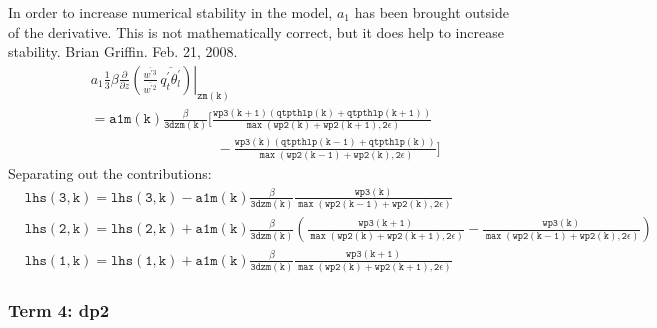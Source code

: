 \documentclass[11pt,fleqn]{article}
\newcommand{\ptlder}[2]{\frac{\partial #1}{\partial #2}}
\begin{document}
%
In order to increase numerical stability in the model, $a_{1}$ has been brought
outside of the derivative.  This is not mathematically correct, but it does 
help to increase stability.  Brian Griffin.  Feb. 21, 2008.
% 
\begin{equation}
\begin{split}
& \left.
  a_1
  \frac{1}{3} \beta
   \ptlder{}{z}
     \left( 
       \frac{\overline{w^{'3}}}{\overline{w^{'2}}} \,
       \overline{q_t^{'}\theta_l^{'}}
     \right)
   \right|_{\mathtt{zm(k)}} \\
&= \mathtt{
    a1m(k)
    \frac{\beta}{3 dzm(k)}
    \bigg[ \frac{wp3(k+1) \left(qtpthlp(k)+qtpthlp(k+1) \right)}
                {\max\left(wp2(k)+wp2(k+1),2\epsilon\right)} } \\
&  \mathtt{ \quad \quad \quad \quad \quad \quad \quad \quad \quad
          -\frac{wp3(k) \left(qtpthlp(k-1)+qtpthlp(k) \right)}
                {\max\left(wp2(k-1)+wp2(k),2\epsilon\right)}
    \bigg]
    }
\end{split}
\end{equation}
%
Separating out the contributions:
%
\begin{equation}
\begin{split}
& \mathtt{ 
   lhs(3,k) = lhs(3,k) - a1m(k)\frac{\beta}{3 dzm(k)}
                 \frac{wp3(k)}
                      {\max\left(wp2(k-1)+wp2(k),2\epsilon\right)}
  } \\
& \mathtt{
   lhs(2,k) = lhs(2,k) + a1m(k)\frac{\beta}{3 dzm(k)}
                 \left(
                   \frac{wp3(k+1)}
                        {\max\left(wp2(k)+wp2(k+1),2\epsilon\right)}
                  -\frac{wp3(k)}
                        {\max\left(wp2(k-1)+wp2(k),2\epsilon\right)}
                 \right)
  } \\
& \mathtt{
   lhs(1,k) = lhs(1,k) + a1m(k)\frac{\beta}{3 dzm(k)}
                 \frac{wp3(k+1)}
                      {\max\left(wp2(k)+wp2(k+1),2\epsilon\right)}
  }
\end{split}
\end{equation}
 
\subsubsection{Term 4:  dp2}
\end{document}
